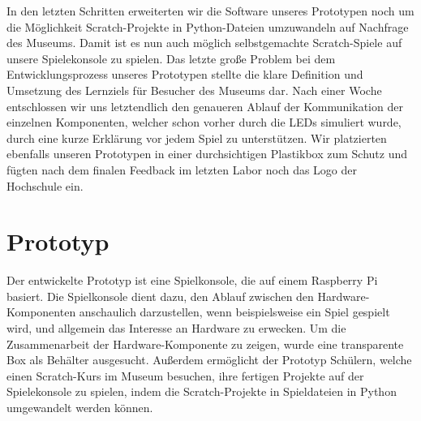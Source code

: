 In den letzten Schritten erweiterten wir die Software unseres Prototypen noch um die Möglichkeit Scratch-Projekte in Python-Dateien umzuwandeln auf Nachfrage des Museums. Damit ist es nun auch möglich selbstgemachte Scratch-Spiele auf unsere Spielekonsole zu spielen. Das letzte große Problem bei dem Entwicklungsprozess unseres Prototypen stellte die klare Definition und Umsetzung des Lernziels für Besucher des Museums dar. Nach einer Woche entschlossen wir uns letztendlich den genaueren Ablauf der Kommunikation der einzelnen Komponenten, welcher schon vorher durch die LEDs simuliert wurde, durch eine kurze Erklärung vor jedem Spiel zu unterstützen.  Wir platzierten ebenfalls unseren Prototypen in einer durchsichtigen Plastikbox zum Schutz und fügten nach dem finalen Feedback im letzten Labor noch das Logo der Hochschule ein.
\clearpage

\section{Prototyp}
Der entwickelte Prototyp ist eine Spielkonsole, die auf einem Raspberry Pi basiert. Die Spielkonsole dient dazu, den Ablauf zwischen den Hardware-Komponenten anschaulich darzustellen, wenn beispielsweise ein Spiel gespielt wird, und allgemein das Interesse an Hardware zu erwecken. Um die Zusammenarbeit der Hardware-Komponente zu zeigen, wurde eine transparente Box als Behälter ausgesucht. Außerdem ermöglicht der Prototyp Schülern, welche einen Scratch-Kurs im Museum besuchen, ihre fertigen Projekte auf der Spielekonsole zu spielen, indem die Scratch-Projekte in Spieldateien in Python umgewandelt werden können. 

